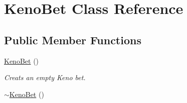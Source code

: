 \hypertarget{classKenoBet}{}\section{Keno\+Bet Class Reference}
\label{classKenoBet}
\subsection*{Public Member Functions}
\begin{DoxyCompactItemize}
\item 
\hyperlink{classKenoBet_a383bdbb38df73584f72670a1cd0f777b}{Keno\+Bet} ()\hypertarget{classKenoBet_a383bdbb38df73584f72670a1cd0f777b}{}\label{classKenoBet_a383bdbb38df73584f72670a1cd0f777b}

\begin{DoxyCompactList}\small\item\em Creats an empty Keno bet. \end{DoxyCompactList}\item 
\hyperlink{classKenoBet_a93324a54b5d94b798939a4b92aeb3de8}{$\sim$\+Keno\+Bet} ()\hypertarget{classKenoBet_a93324a54b5d94b798939a4b92aeb3de8}{}\label{classKenoBet_a93324a54b5d94b798939a4b92aeb3de8}


\end{DoxyCompactItemize}
